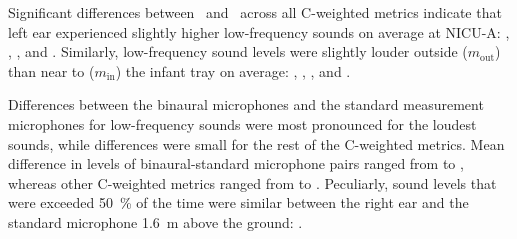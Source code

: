 Significant differences between \binL\ and \binR\ across all C-weighted metrics indicate that left ear experienced slightly higher low-frequency sounds on average at NICU-A: , , , and  \dbc{}. Similarly, low-frequency sound levels were slightly louder outside ($m_\text{out}$) than near to ($m_\text{in}$) the infant tray on average:  , , , and  \dbc{}. 

Differences between the binaural microphones and the standard measurement microphones for low-frequency sounds were most pronounced for the loudest sounds, while differences were small for the rest of the C-weighted metrics. Mean difference in  levels of binaural-standard microphone pairs ranged from  to  \dbc{}, whereas other C-weighted metrics ranged from  to  \dbc{}. Peculiarly, sound levels that were exceeded \SI{50}{\percent} of the time were similar between the right ear and the standard microphone \SI{1.6}{\meter} above the ground:  \dbc{}. 



